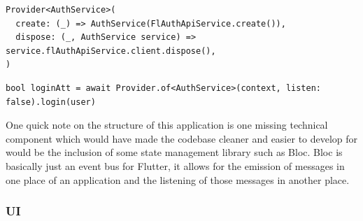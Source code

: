 \documentclass{article}
\newcommand{\vspaceconst}{-2ex}
\begin{document}
\begin{multicols}{2}
\lstset{language=Dart}
\begin{lstlisting}[label={code:flutterProviderInrAuthEx}, caption={Provider injection example with the Authentication service client}]
Provider<AuthService>(
  create: (_) => AuthService(FlAuthApiService.create()),
  dispose: (_, AuthService service) => service.flAuthApiService.client.dispose(),
)
\end{lstlisting}

\begin{lstlisting}[label={code:flutterProviderOutAuthEx}, caption={Provider consuming dependency example with the Authentication service client}]
bool loginAtt = await Provider.of<AuthService>(context, listen: false).login(user)
\end{lstlisting}
\lstset{language=TypeScript}

One quick note on the structure of this application is one missing technical component which would have made the codebase cleaner and easier to develop for would be the inclusion of some state management library such as Bloc\cite{bloc}. Bloc is basically just an event bus for Flutter, it allows for the emission of messages in one place of an application and the listening of those messages in another place.\\

\subsubsection{UI}
\vspace{\vspaceconst}


\end{multicols}
\end{document}
